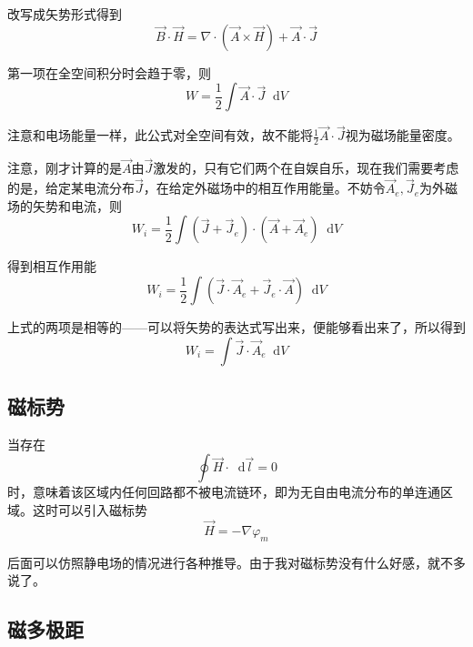 \documentclass[UTF8]{ctexart}
\newcommand*{\dif}{\mathop{}\!\mathrm{d}}
\begin{document}
\noindent 改写成矢势形式得到
\begin{equation}
    \vec{B} \cdot \vec{H} = \nabla \cdot (\vec{A} \times \vec{H}) + \vec{A} \cdot \vec{J}
\end{equation}

\noindent 第一项在全空间积分时会趋于零，则
\begin{equation}
    W = \frac{1}{2} \int \vec{A} \cdot \vec{J} \dif V
\end{equation}

\noindent 注意和电场能量一样，此公式对全空间有效，故不能将$\frac{1}{2} \vec{A} \cdot \vec{J}$视为磁场能量密度。

    注意，刚才计算的是$\vec{A}$由$\vec{J}$激发的，只有它们两个在自娱自乐，现在我们需要考虑的是，给定某电流分布$\vec{J}$，在给定外磁场中的相互作用能量。不妨令$\vec{A}_e,\vec{J}_e$为外磁场的矢势和电流，则
    \begin{equation}
        W_i = \frac{1}{2} \int (\vec{J} + \vec{J}_e)\cdot (\vec{A} + \vec{A}_e)\dif V
    \end{equation}

\noindent 得到相互作用能
\begin{equation}
    W_i = \frac{1}{2}\int (\vec{J} \cdot \vec{A}_e + \vec{J}_e \cdot \vec{A}) \dif V
\end{equation}

\noindent 上式的两项是相等的——可以将矢势的表达式写出来，便能够看出来了，所以得到
\begin{equation}
    W_i = \int \vec{J} \cdot \vec{A}_e \dif V
\end{equation}

    \subsection{磁标势}
    当存在
    \begin{equation}
        \oint \vec{H} \cdot \dif \vec{l} = 0
    \end{equation}
\noindent 时，意味着该区域内任何回路都不被电流链环，即为无自由电流分布的单连通区域。这时可以引入磁标势
\begin{equation}
    \vec{H} = - \nabla \varphi_m
\end{equation}

\noindent 后面可以仿照静电场的情况进行各种推导。由于我对磁标势没有什么好感，就不多说了。

    \subsection{磁多极距}
\end{document}
